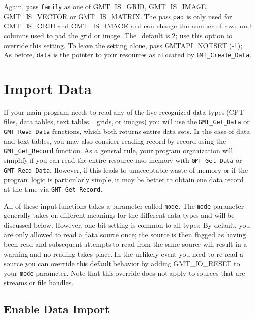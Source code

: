 \documentclass[11pt]{report}
\begin{document}
Again, pass \texttt{family} as one of GMT\_IS\_GRID, GMT\_IS\_IMAGE, GMT\_IS\_VECTOR or GMT\_IS\_MATRIX.
The pass \texttt{pad} is only used for GMT\_IS\_GRID and GMT\_IS\_IMAGE and can change the number of
rows and columns used to pad the grid or image.  The \GMT\ default is 2; use this option to override
this setting.  To leave the setting alone, pass GMTAPI\_NOTSET (-1);  As before, \texttt{data}
is the pointer to your resources as allocated by \texttt{GMT\_Create\_Data}.

\section{Import Data}

If your main program needs to read any of the five recognized data types (CPT files, data tables, text tables, \GMT\ grids, or images)
you will use the \texttt{GMT\_Get\_Data} or \texttt{GMT\_Read\_Data} functions, which both returns entire data sets.
In the case of data and text tables, you may also consider reading record-by-record using the \texttt{GMT\_Get\_Record} function.
As a general rule, your program organization will simplify if you can read the entire resource into memory with
\texttt{GMT\_Get\_Data} or \texttt{GMT\_Read\_Data}.  However, if this leads to unacceptable waste of memory or if the program logic is particularly simple,
it may be better to obtain one data record at the time via \texttt{GMT\_Get\_Record}.

All of these input functions takes a parameter called \texttt{mode}.  The \texttt{mode} parameter generally
takes on different meanings for the different data types and will be discussed below.
However, one bit setting is common to all types: By default, you are only allowed to read a
data source once; the source is then flagged as having been read and subsequent attempts to read
from the same source will result in a warning and no reading takes place.  In the unlikely event you need to re-read a
source you can override this default behavior by adding GMT\_IO\_RESET to your \texttt{mode} parameter.
Note that this override does not apply to sources that are streams or file handles.

\subsection{Enable Data Import}
\end{document}
